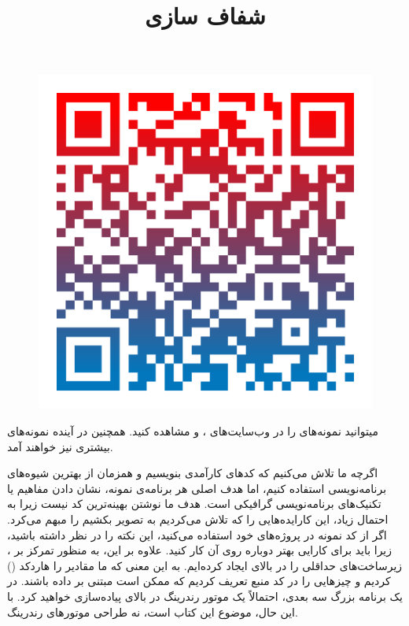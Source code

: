 {    \begin{figure}[H]
        \centering
        \setlength{\belowcaptionskip}{-10pt}
        \includegraphics[scale=0.15]{Images/3/3.Intro.1.3}
        \caption*{\Large {}}
    \end{figure}

    میتوانید نمونه‌های  را در وب‌سایت‌های ،  و  مشاهده کنید. همچنین در آینده نمونه‌های بیشتری نیز خواهند آمد.
}
\textbf{\vspace{25pt}}
\newpage

\title{
    \LARGE
    \textbf{شفاف سازی}
} \rullFillWithLine[0.5em]{1pt}
\textbf{\vspace{12pt}}

{
    \Large
    \begin{spacing}{1.5}
        اگرچه ما تلاش می‌کنیم که کد‌های کارآمدی بنویسیم و همزمان از بهترین شیوه‌های برنامه‌نویسی  استفاده کنیم، اما هدف اصلی هر برنامه‌ی نمونه، نشان دادن مفاهیم  یا تکنیک‌های برنامه‌نویسی گرافیکی است.
        هدف ما نوشتن بهینه‌ترین کد نیست زیرا به احتمال زیاد، این کار‌ایده‌هایی را که تلاش می‌کردیم به تصویر بکشیم را مبهم می‌کرد.
        اگر از کد نمونه در پروژه‌های خود استفاده می‌کنید، این نکته را در نظر داشته باشید، زیرا باید برای کارایی بهتر دوباره روی آن کار کنید.
        علاوه بر این، به منظور تمرکز بر ، زیرساخت‌های حداقلی را در بالای  ایجاد کرده‌ایم. به این معنی که ما مقادیر را هاردکد () کردیم و چیز‌هایی را در کد منبع تعریف کردیم که ممکن است مبتنی بر داده باشند.
        در یک برنامه بزرگ سه بعدی، احتمالاً یک موتور رندرینگ در بالای  پیاده‌سازی خواهید کرد. با این حال، موضوع این کتاب  است، نه طراحی موتور‌های رندرینگ.
    \end{spacing}
}
\textbf{\vspace{25pt}}

